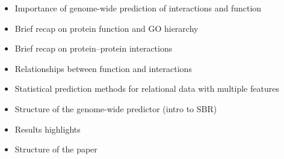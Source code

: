 \documentclass{bioinfo}
\begin{document}
\begin{itemize}

    \item Importance of genome-wide prediction of interactions and function

    \item Brief recap on protein function and GO hierarchy

    \item Brief recap on protein--protein interactions

    \item Relationships between function and interactions

    \item Statistical prediction methods for relational data with multiple
    features

    \item Structure of the genome-wide predictor (intro to SBR)

    \item Results highlights

    \item Structure of the paper

\end{itemize}
\end{document}
